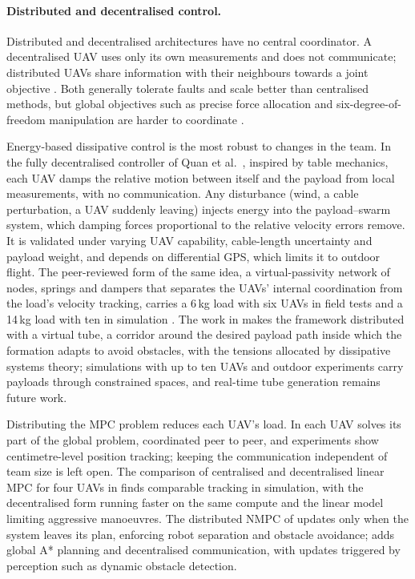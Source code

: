 \paragraph{Distributed and decentralised control.} Distributed and decentralised architectures have no central
coordinator. A decentralised UAV uses only its own measurements and does not communicate; distributed UAVs share
information with their neighbours towards a joint objective \cite{nathanReviewAutonomousMultiagent2011}. Both
generally tolerate faults and scale better than centralised methods, but global objectives such as precise force
allocation and six-degree-of-freedom manipulation are harder to coordinate
\cite{scattoliniArchitecturesDistributedHierarchical2009}.

Energy-based dissipative control is the most robust to changes in the team. In the fully decentralised controller
of Quan et al.\ \cite{quan2025swarm}, inspired by table mechanics, each UAV damps the relative motion between
itself and the payload from local measurements, with no communication. Any disturbance (wind, a cable
perturbation, a UAV suddenly leaving) injects energy into the payload--swarm system, which damping forces
proportional to the relative velocity errors remove. It is validated under varying UAV capability, cable-length
uncertainty and payload weight, and depends on differential GPS, which limits it to outdoor flight. The
peer-reviewed form of the same idea, a virtual-passivity network of nodes, springs and dampers that separates the
UAVs' internal coordination from the load's velocity tracking, carries a 6\,kg load with six UAVs in field tests
and a 14\,kg load with ten in simulation \cite{liu2026passivity}. The work in
\cite{liuVirtualTubeBasedCooperativeTransport2026} makes the framework distributed with a virtual tube, a corridor
around the desired payload path inside which the formation adapts to avoid obstacles, with the tensions allocated
by dissipative systems theory; simulations with up to ten UAVs and outdoor experiments carry payloads through
constrained spaces, and real-time tube generation remains future work.

Distributing the MPC problem reduces each UAV's load. In \cite{distributedNMPC} each UAV solves its part of the
global problem, coordinated peer to peer, and experiments show centimetre-level position tracking; keeping the
communication independent of team size is left open. The comparison of centralised and decentralised linear MPC
for four UAVs in \cite{DistributedMPC} finds comparable tracking in simulation, with the decentralised form running
faster on the same compute and the linear model limiting aggressive manoeuvres. The distributed NMPC of
\cite{tasoojiEventTriggeredNonlinearModel} updates only when the system leaves its plan, enforcing robot
separation and obstacle avoidance; \cite{tasoojiCooperativeControlMultiQuadrotors} adds global A* planning and
decentralised communication, with updates triggered by perception such as dynamic obstacle detection.

